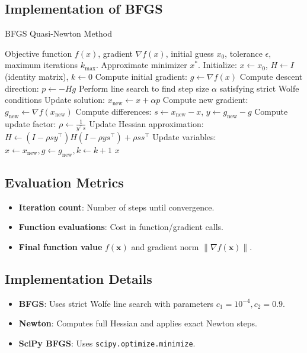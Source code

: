 \documentclass[a4paper,12pt]{article}
\begin{document}
\subsection{Implementation of BFGS}
\begin{algorithm}
\caption{BFGS Quasi-Newton Method}
\label{alg:BFGS}
\begin{algorithmic}[1]
\Require Objective function $f(x)$, gradient $\nabla f(x)$, initial guess $x_0$, tolerance $\epsilon$, maximum iterations $k_{\max}$.
\Ensure Approximate minimizer $x^*$.
\State Initialize: $x \gets x_0$, $H \gets I$ (identity matrix), $k \gets 0$
\State Compute initial gradient: $g \gets \nabla f(x)$
    \State Compute descent direction: $p \gets - H g$
    \State Perform line search to find step size $\alpha$ satisfying strict Wolfe conditions
    \State Update solution: $x_{\text{new}} \gets x + \alpha p$
    \State Compute new gradient: $g_{\text{new}} \gets \nabla f(x_{\text{new}})$
    \State Compute differences: $s \gets x_{\text{new}} - x$, $y \gets g_{\text{new}} - g$
     
        \State Compute update factor: $\rho \gets \frac{1}{y^\top s}$
        \State Update Hessian approximation:
        \State $H \gets (I - \rho s y^\top) H (I - \rho y s^\top) + \rho s s^\top$
    \EndIf
    \State Update variables: $x \gets x_{\text{new}}, g \gets g_{\text{new}}, k \gets k + 1$
\EndWhile
\State \Return $x$
\end{algorithmic}
\end{algorithm}

\subsection{Evaluation Metrics}
\begin{itemize}
    \item \textbf{Iteration count}: Number of steps until convergence.
    \item \textbf{Function evaluations}: Cost in function/gradient calls.
    \item \textbf{Final function value} \( f(\mathbf{x}) \) and gradient norm \( \|\nabla f(\mathbf{x})\| \).
\end{itemize}
\subsection{Implementation Details}
\begin{itemize}
    \item \textbf{BFGS}: Uses strict Wolfe line search with parameters \( c_1 = 10^{-4}, c_2 = 0.9 \).
    \item \textbf{Newton}: Computes full Hessian and applies exact Newton steps.
    \item \textbf{SciPy BFGS}: Uses \texttt{scipy.optimize.minimize}.
\end{itemize}
\end{document}
